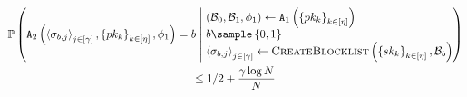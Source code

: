 \begin{theorem}
	\begin{footnotesize}
		\begin{gather*}
			\cprob{\Bigg}{\begin{array}{@{}r@{}}
					\adversary[2]\left(\tupleDefn{\genericSig_{\indBit, \projIdx}}{\projIdx \in 
					\nats[\numProjections]},  
					\setOfAuditorPubkeys, \adversaryState{1}\right) = \indBit
			\end{array}}{\begin{array}[m]{@{}l@{}}
					(\blocklist_0, \blocklist_1, \adversaryState{1}) \assign 
					\adversary[1]\left(\setOfAuditorPubkeys\right) 
					\\
					\indBit \getsr \setDefn{0,1} \\
					\tupleDefn{\genericSig_{\indBit, \projIdx}}{\projIdx \in \nats[\numProjections]} \assign  
					\createBlocklist\left(\setOfAuditorPrivkeys, 
					\blocklist_\indBit\right) 
			\end{array}} \\ \le 1/2 + \frac{\numProjections \log \rsaMod}{\rsaMod}
		\end{gather*}
		
	\end{footnotesize}
	
	
	
	\enumListEnd  
	
	
	
\end{theorem}
\fi

